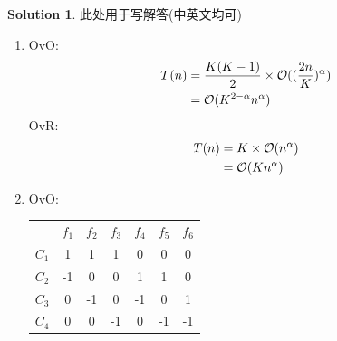 \documentclass[a4paper,UTF8]{article}
\numberwithin{equation}{section}
\theoremstyle{definition}
\newtheorem*{solution}{Solution}
\begin{document}
\begin{solution}
	此处用于写解答(中英文均可)
	\begin{enumerate}
		\item[(1)]
		OvO:\\
		\begin{equation}
			\begin{split}
				T(n) &= \frac{K(K-1)}{2} \times \mathcal{O}( (\frac{2n}{K})^{\alpha}) \\
				     &= \mathcal{O}(K^{2-\alpha}n^{\alpha})
			\end{split}
			\notag
		\end{equation}
		OvR: \\
		\begin{equation}
			\begin{split}
				T(n) &= K \times \mathcal{O} (n^{\alpha}) \\
				&= \mathcal{O}(Kn^{\alpha})
			\end{split}
			\notag
		\end{equation}
		\item[(2)]
		OvO: \\
		\begin{table}[H]
			\centering
			\begin{tabular}{ccccccc}
									   & $f_1$                   & $f_2$                   & $f_3$                   & $f_4$                   & $f_5$                   & $f_6$                   \\ \cline{2-7} 
			\multicolumn{1}{c|}{$C_1$} & \multicolumn{1}{c|}{1}  & \multicolumn{1}{c|}{1}  & \multicolumn{1}{c|}{1}  & \multicolumn{1}{c|}{0}  & \multicolumn{1}{c|}{0}  & \multicolumn{1}{c|}{0}  \\ \cline{2-7} 
			\multicolumn{1}{c|}{$C_2$} & \multicolumn{1}{c|}{-1} & \multicolumn{1}{c|}{0}  & \multicolumn{1}{c|}{0}  & \multicolumn{1}{c|}{1}  & \multicolumn{1}{c|}{1}  & \multicolumn{1}{c|}{0}  \\ \cline{2-7} 
			\multicolumn{1}{c|}{$C_3$} & \multicolumn{1}{c|}{0}  & \multicolumn{1}{c|}{-1} & \multicolumn{1}{c|}{0}  & \multicolumn{1}{c|}{-1} & \multicolumn{1}{c|}{0}  & \multicolumn{1}{c|}{1}  \\ \cline{2-7} 
			\multicolumn{1}{c|}{$C_4$} & \multicolumn{1}{c|}{0}  & \multicolumn{1}{c|}{0}  & \multicolumn{1}{c|}{-1} & \multicolumn{1}{c|}{0}  & \multicolumn{1}{c|}{-1} & \multicolumn{1}{c|}{-1} \\ \cline{2-7} 
			\end{tabular}
			\end{table}

\end{enumerate}
\end{solution}
\end{document}
